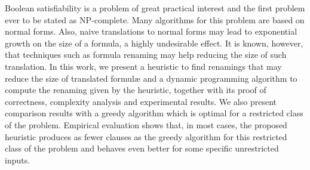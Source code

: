 Boolean satisfiability is a problem of great practical interest and the first problem ever to be stated as NP-complete. Many algorithms for this problem are based on normal forms. Also, naive translations to normal forms may lead to exponential growth on the size of a formula, a highly undesirable effect. It is known, however, that techniques such as formula renaming may help reducing the size of such translation. In this work, we present a heuristic to find renamings that may reduce the size of translated formul\ae \; and a dynamic programming algorithm to compute the renaming given by the heuristic, together with its proof of correctness, complexity analysis and experimental results. We also present comparison results with a greedy algorithm which is optimal for a restricted class of the problem. Empirical evaluation shows that, in most cases, the proposed heuristic produces as fewer clauses as the greedy algorithm for this restricted class of the problem and behaves even better for some specific unrestricted inputs.
